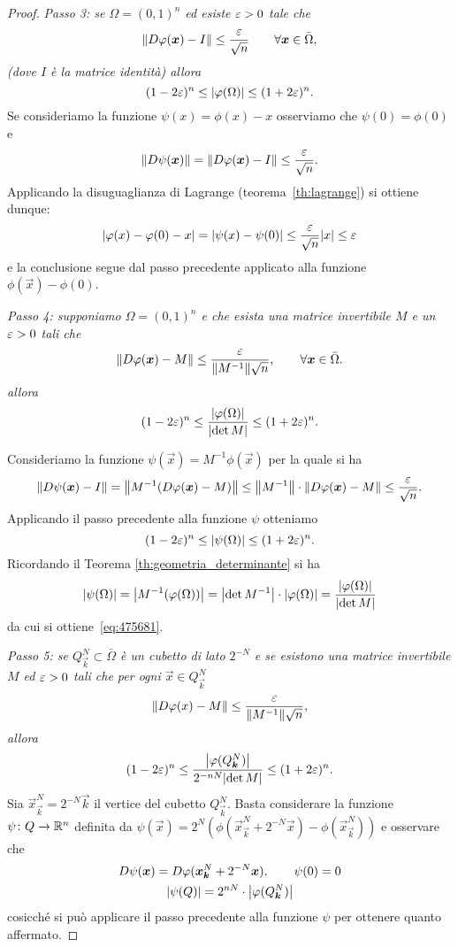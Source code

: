 \begin{proof}
\emph{Passo 3: se $\Omega=(0,1)^n$ ed esiste $\varepsilon>0$ tale che 
\[
  {\left\Vert  D\varphi(\boldsymbol x) - I\right\Vert} \le \frac{\varepsilon}{\sqrt n} \qquad \forall \boldsymbol x \in \bar \Omega,
\]
(dove $I$ è la matrice identità)
allora
\[
 (1-2\varepsilon)^n \le {\left|\varphi(\Omega)\right|} \le (1+2\varepsilon)^n.
\]
}
Se consideriamo la funzione $\psi(x) = \phi(x) - x$ osserviamo che $\psi(0)=\phi(0)$ e
\[
{\left\Vert D\psi(\boldsymbol x)\right\Vert} = {\left\Vert D\varphi(\boldsymbol x) -I\right\Vert} \le \frac{\varepsilon}{\sqrt n}.
\]
Applicando la disuguaglianza di Lagrange (teorema~\ref{th:lagrange}) si ottiene dunque:
\[
{\left|\varphi(x) - \varphi(0) - x\right|} = {\left|\psi(x)-\psi(0)\right|} \le \frac {\varepsilon} {\sqrt n} {\left|x\right|} \le \varepsilon
\]
e la conclusione segue dal passo precedente applicato alla funzione $\phi(\vec x) - \phi(0)$.

\emph{Passo 4: supponiamo $\Omega=(0,1)^n$ e che esista una matrice invertibile $M$ e un $\varepsilon>0$ tali che
\[
  {\left\Vert D\varphi(\boldsymbol x) - M\right\Vert} \le \frac{\varepsilon}{{\left\Vert M^{-1}\right\Vert} \sqrt n}, \qquad \forall \boldsymbol x \in \bar \Omega.
\]
allora
\begin{equation}\label{eq:475681}
(1-2\varepsilon)^n \le \frac{{\left|\varphi(\Omega)\right|}}{{\left|\det M\right|}} \le (1+2\varepsilon)^n.
\end{equation}
}

Consideriamo la funzione $\psi(\vec x) = M^{-1} \phi(\vec x)$ per la quale si ha  
\[
  {\left\Vert D\psi(\boldsymbol x)-I\right\Vert} 
  = {\left\Vert M^{-1} (D\varphi(\boldsymbol x)-M)\right\Vert} 
  \le {\left\Vert M^{-1}\right\Vert} \cdot {\left\Vert D\varphi(\boldsymbol x)-M\right\Vert}
  \le \frac{\varepsilon}{\sqrt n}.
\]
Applicando il passo precedente alla funzione $\psi$ otteniamo 
\[
(1-2\varepsilon)^n \le {\left|\psi(\Omega)\right|} \le (1+2\varepsilon)^n.
\]
Ricordando il Teorema \ref{th:geometria_determinante} si ha
\[
  {\left|\psi(\Omega)\right|} = {\left|M^{-1}(\varphi(\Omega))\right|}
  = {\left|\det M^{-1}\right|} \cdot {\left|\varphi(\Omega)\right|}
  = \frac{{\left|\varphi(\Omega)\right|}}{{\left|\det M\right|}}
\]
da cui si ottiene~\eqref{eq:475681}.

\emph{Passo 5: se $Q^N_{\vec k}\subset \bar \Omega$ è un cubetto di lato $2^{-N}$
e se esistono una matrice invertibile $M$ ed $\varepsilon>0$ tali che per ogni $\vec x \in Q^N_{\vec k}$
\[
  {\left\Vert D\varphi(x)-M\right\Vert} \le \frac{\varepsilon}{{\left\Vert M^{-1}\right\Vert} \sqrt n},
\]
allora
\[
(1-2\varepsilon)^n \le \frac{{\left|\varphi(Q^N_{\boldsymbol k})\right|}}{2^{-nN}{\left|\det M\right|}} \le (1+2\varepsilon)^n.
\]
}
Sia $\vec x^N_{\vec k} = 2^{-N}\vec k$ il vertice del cubetto $Q^N_{\vec k}$.
Basta considerare la funzione $\psi\colon Q\to {\mathbb R}^n$ 
definita da $\psi(\vec x) = 2^N(\phi(\vec x^N_{\vec k} + 2^{-N}\vec x)-\phi(\vec x^N_{\vec k}))$ 
e osservare che
\begin{gather*}
  D\psi(\boldsymbol x)
  = D\varphi(\boldsymbol x^N_{\boldsymbol k} + 2^{-N}\boldsymbol x), \qquad \psi(0)=0\\
  {\left|\psi(Q)\right|} = 2^{nN} \cdot {\left|\varphi(Q^N_{\boldsymbol k})\right|}
\end{gather*}
cosicché si può applicare il passo precedente alla funzione $\psi$
per ottenere quanto affermato.


\end{proof}
